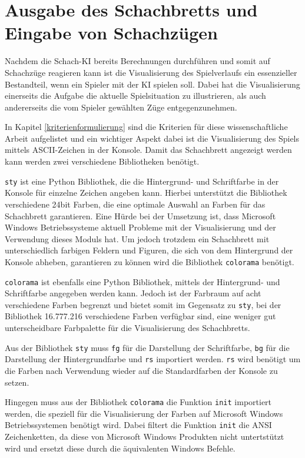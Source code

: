     \section{Ausgabe des Schachbretts und Eingabe von
Schachzügen}\label{ausgabe-des-schachbretts-und-eingabe-von-schachzuxfcgen}

Nachdem die Schach-KI bereits Berechnungen durchführen und somit auf
Schachzüge reagieren kann ist die Visualisierung des Spielverlaufs ein
essenzieller Bestandteil, wenn ein Spieler mit der KI spielen soll.
Dabei hat die Visualisierung einerseits die Aufgabe die aktuelle
Spielsituation zu illustrieren, als auch andererseits die vom Spieler
gewählten Züge entgegenzunehmen.

In Kapitel \ref{kriterienformulierung} sind die Kriterien für diese wissenschaftliche Arbeit
aufgelistet und ein wichtiger Aspekt dabei ist die Visualisierung des
Spiels mittels ASCII-Zeichen in der Konsole. Damit das Schachbrett
angezeigt werden kann werden zwei verschiedene Bibliotheken benötigt.

\texttt{sty} ist eine Python Bibliothek, die die Hintergrund- und
Schriftfarbe in der Konsole für einzelne Zeichen angeben kann. Hierbei
unterstützt die Bibliothek verschiedene 24bit Farben, die eine optimale
Auswahl an Farben für das Schachbrett garantieren. Eine Hürde bei der
Umsetzung ist, dass Microsoft Windows Betriebssysteme aktuell Probleme
mit der Visualisierung und der Verwendung dieses Moduls hat. Um jedoch
trotzdem ein Schachbrett mit unterschiedlich farbigen Feldern und
Figuren, die sich von dem Hintergrund der Konsole abheben, garantieren
zu können wird die Bibliothek \texttt{colorama} benötigt.

\texttt{colorama} ist ebenfalls eine Python Bibliothek, mittels der
Hintergrund- und Schriftfarbe angegeben werden kann. Jedoch ist der
Farbraum auf acht verschiedene Farben begrenzt und bietet somit im
Gegensatz zu \texttt{sty}, bei der Bibliothek 16.777.216 verschiedene
Farben verfügbar sind, eine weniger gut unterscheidbare Farbpalette für
die Visualisierung des Schachbretts.

Aus der Bibliothek \texttt{sty} muss \texttt{fg} für die Darstellung der
Schriftfarbe, \texttt{bg} für die Darstellung der Hintergrundfarbe und
\texttt{rs} importiert werden. \texttt{rs} wird benötigt um die Farben
nach Verwendung wieder auf die Standardfarben der Konsole zu setzen.

Hingegen muss aus der Bibliothek \texttt{colorama} die Funktion
\texttt{init} importiert werden, die speziell für die Visualisierung der
Farben auf Microsoft Windows Betriebssystemen benötigt wird. Dabei
filtert die Funktion \texttt{init} die ANSI Zeichenketten, da diese von
Microsoft Windows Produkten nicht untertstützt wird und ersetzt diese
durch die äquivalenten Windows Befehle.

